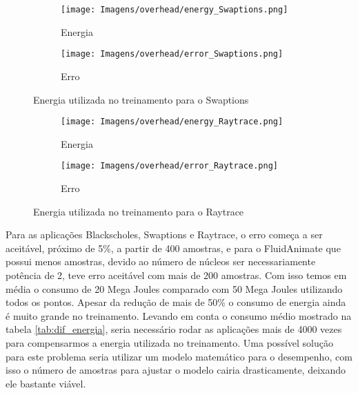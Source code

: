 \begin{figure}[H]
	\centering
	\begin{subfigure}[t]{0.48\textwidth}
		\texttt{[image: Imagens/overhead/energy\_Swaptions.png]}
		\caption{Energia}
	\end{subfigure}\hspace{0.04\textwidth}%
	\begin{subfigure}[t]{0.48\textwidth}
		\texttt{[image: Imagens/overhead/error\_Swaptions.png]}
		\caption{Erro}
	\end{subfigure}%
	\caption{Energia utilizada no treinamento para o Swaptions}
	\label{fig:over_swap}
\end{figure}

\begin{figure}[H]
	\centering
	\begin{subfigure}[t]{0.48\textwidth}
		\texttt{[image: Imagens/overhead/energy\_Raytrace.png]}
		\caption{Energia}
	\end{subfigure}\hspace{0.04\textwidth}%
	\begin{subfigure}[t]{0.48\textwidth}
		\texttt{[image: Imagens/overhead/error\_Raytrace.png]}
		\caption{Erro}
	\end{subfigure}%
	\caption{Energia utilizada no treinamento para o Raytrace}
	\label{fig:over_raytrace}
\end{figure}


Para as aplicações Blackscholes, Swaptions e Raytrace, o erro começa a ser aceitável, próximo de 5\%, a partir de 400 amostras, e para o FluidAnimate que possui menos amostras, devido ao número de núcleos ser necessariamente potência de 2, teve erro aceitável com mais de 200 amostras. Com isso temos em média o consumo de 20 Mega Joules comparado com 50 Mega Joules utilizando todos os pontos. Apesar da redução de mais de 50\% o consumo de energia ainda é muito grande no treinamento. Levando em conta o consumo médio mostrado na tabela \ref{tab:dif_energia}, seria necessário rodar as aplicações mais de 4000 vezes para compensarmos a energia utilizada no treinamento. Uma possível solução para este problema seria utilizar um modelo matemático para o desempenho, com isso o número de amostras para ajustar o modelo cairia drasticamente, deixando ele bastante viável.